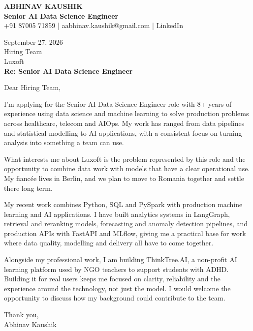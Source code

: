 \documentclass[10pt,a4paper]{article}
\begin{document}
\begin{center}
{\Large\bfseries ABHINAV KAUSHIK}\\[2pt]
{\bfseries Senior AI Data Science Engineer}\\[2pt]
+91 87005 71859 \quad | \quad aabhinav.kaushik@gmail.com \quad | \quad LinkedIn
\end{center}
\vspace{8pt}
September 27, 2026\\[6pt]
Hiring Team\\
Luxoft\\[4pt]
\textbf{Re: Senior AI Data Science Engineer}

Dear Hiring Team,

I’m applying for the Senior AI Data Science Engineer role with 8+ years of experience using data science and machine learning to solve production problems across healthcare, telecom and AIOps. My work has ranged from data pipelines and statistical modelling to AI applications, with a consistent focus on turning analysis into something a team can use.

What interests me about Luxoft is the problem represented by this role and the opportunity to combine data work with models that have a clear operational use. My fiancée lives in Berlin, and we plan to move to Romania together and settle there long term.

My recent work combines Python, SQL and PySpark with production machine learning and AI applications. I have built analytics systems in LangGraph, retrieval and reranking models, forecasting and anomaly detection pipelines, and production APIs with FastAPI and MLflow, giving me a practical base for work where data quality, modelling and delivery all have to come together.

Alongside my professional work, I am building ThinkTree.AI, a non-profit AI learning platform used by NGO teachers to support students with ADHD. Building it for real users keeps me focused on clarity, reliability and the experience around the technology, not just the model. I would welcome the opportunity to discuss how my background could contribute to the team.

Thank you,\\
Abhinav Kaushik
\end{document}
